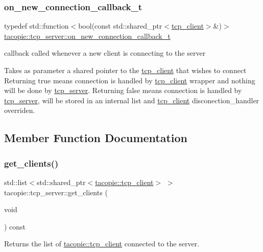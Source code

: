 \subsubsection{\texorpdfstring{on\+\_\+new\+\_\+connection\+\_\+callback\+\_\+t}{on\_new\_connection\_callback\_t}}
{\footnotesize\ttfamily typedef std\+::function$<$bool(const std\+::shared\+\_\+ptr$<$\hyperlink{classtacopie_1_1tcp__client}{tcp\+\_\+client}$>$\&)$>$ \hyperlink{classtacopie_1_1tcp__server_a103cb4e6fcab00f88a708aabd38b66ff}{tacopie\+::tcp\+\_\+server\+::on\+\_\+new\+\_\+connection\+\_\+callback\+\_\+t}}

callback called whenever a new client is connecting to the server

Takes as parameter a shared pointer to the \hyperlink{classtacopie_1_1tcp__client}{tcp\+\_\+client} that wishes to connect Returning true means connection is handled by \hyperlink{classtacopie_1_1tcp__client}{tcp\+\_\+client} wrapper and nothing will be done by \hyperlink{classtacopie_1_1tcp__server}{tcp\+\_\+server}. Returning false means connection is handled by \hyperlink{classtacopie_1_1tcp__server}{tcp\+\_\+server}, will be stored in an internal list and \hyperlink{classtacopie_1_1tcp__client}{tcp\+\_\+client} disconection\+\_\+handler overriden. 

\subsection{Member Function Documentation}
\mbox{\label{classtacopie_1_1tcp__server_ab98d0a169bda6915dd46f1cd117d37a6}} 
\subsubsection{\texorpdfstring{get\+\_\+clients()}{get\_clients()}}
{\footnotesize\ttfamily std\+::list$<$std\+::shared\+\_\+ptr$<$\hyperlink{classtacopie_1_1tcp__client}{tacopie\+::tcp\+\_\+client}$>$ $>$ tacopie\+::tcp\+\_\+server\+::get\+\_\+clients (\begin{DoxyParamCaption}\item[{void}]{ }\end{DoxyParamCaption}) const}

\begin{DoxyReturn}{Returns}
the list of \hyperlink{classtacopie_1_1tcp__client}{tacopie\+::tcp\+\_\+client} connected to the server. 
\end{DoxyReturn}
\mbox{\label{classtacopie_1_1tcp__server_aace4796627b6abccccce1a541908414f}} 
